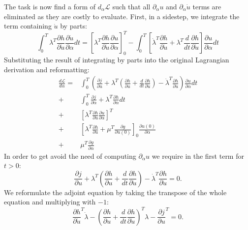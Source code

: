 \documentclass[10pt]{article}
\begin{document}
The task is now find a form of $d_{\alpha}\mathcal{L}$ such that all $\partial_{\alpha} u$ and $\partial_{\alpha}\dot u$ terms are eliminated as they are costly to evaluate. First, in a sidestep, we integrate the term containing $\dot u$ by parts:
\begin{equation}
\int_{0}^{T} \lambda^T \frac{\partial h}{\partial\dot u} \frac{\partial\dot u}{\partial \alpha} dt =
\left[ \lambda^T \frac{\partial h}{\partial\dot u} \frac{\partial u}{\partial \alpha} \right]^{T}_{0} - 
\int_{0}^{T} \left[\dot \lambda^T \frac{\partial h}{\partial\dot u} + \lambda^T \frac{d}{dt}\frac{\partial h}{\partial\dot u} \right] 
\frac{\partial u}{\partial \alpha} dt
\end{equation}
Substituting the result of integrating by parts into the original Lagrangian derivation and reformatting:
\begin{align}
\frac{d\mathcal{L}}{d \alpha} = 
&\int_{0}^{T}\left( \frac{\partial j}{\partial u} + \lambda^T \left(  \frac{\partial h}{\partial u} + \frac{d}{dt}\frac{\partial h}{\partial\dot u} \right) - \dot\lambda^T \frac{\partial h}{\partial\dot u} \right) \frac{\partial u}{\partial \alpha} dt \\
+&\int_{0}^{T}\frac{\partial j}{\partial \alpha} + \lambda^T \frac{\partial h}{\partial \alpha} dt \\
+& \left[ \lambda^T \frac{\partial h}{\partial\dot u} \frac{\partial u}{\partial \alpha} \right]^{T} \\
+& \left[ \lambda^T \frac{\partial h}{\partial\dot u} + \mu^T \frac{\partial g}{\partial u(0)} \right]_{0}  \frac{\partial u(0)}{\partial \alpha} \\
+& \mu^T\frac{\partial g}{\partial\alpha}
\end{align}
In order to get avoid the need of computing $\partial_{\alpha} u$ we require in the first term for $t>0$:
\begin{equation}
\frac{\partial j}{\partial u} + \lambda^T \left(  \frac{\partial h}{\partial u} + \frac{d}{dt}\frac{\partial h}{\partial\dot u} \right) - \dot\lambda^T \frac{\partial h}{\partial\dot u} = 0.
\end{equation}
We reformulate the adjoint equation by taking the transpose of the whole equation and multiplying with $-1$:
\begin{equation}
\frac{\partial h}{\partial\dot u}^T\dot\lambda - \left(\frac{\partial h}{\partial u} + \frac{d}{dt}\frac{\partial h}{\partial\dot u} \right)^T \lambda  - \frac{\partial j}{\partial u}^T  = 0.
\end{equation}
\end{document}

